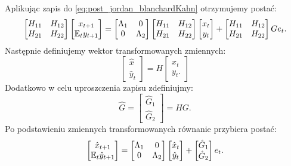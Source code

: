Aplikując zapis do \eqref{eq:post_jordan_blanchardKahn} otrzymujemy postać:
\begin{equation}
    \begin{bmatrix}
    H_{11} & H_{12} \\
    H_{21} & H_{22}
    \end{bmatrix}
    \begin{bmatrix}
    x_{t+1} \\
    \mathbb{E}_t y_{t+1}
\end{bmatrix} = \begin{bmatrix}
    \Lambda_{1} & 0 \\
    0 & \Lambda_{2}
    \end{bmatrix} \begin{bmatrix}
    H_{11} & H_{12} \\
    H_{21} & H_{22}
    \end{bmatrix} \begin{bmatrix}
    x_{t} \\
    y_{t}
\end{bmatrix} + \begin{bmatrix}
    H_{11} & H_{12} \\
    H_{21} & H_{22}
    \end{bmatrix} G e_t.
\end{equation}
Następnie definiujemy wektor transformowanych zmiennych:
\begin{equation}
\label{eqn:bk-transform}
    \begin{bmatrix}
    \hat{x}_{} \\
    \hat{y}_{t}
    \end{bmatrix} = H \begin{bmatrix}
    x_{t} \\
    y_{t}.
\end{bmatrix}
\end{equation}
Dodatkowo w celu uproszczenia zapisu zdefiniujmy:
\begin{equation}
    \hat{G} = \begin{bmatrix}
        \hat{G}_1 \\
        \hat{G}_2
    \end{bmatrix} = H G.
\end{equation}
Po podstawieniu zmiennych transformowanych równanie przybiera postać:
\begin{equation}
    \begin{bmatrix}
    \hat{x}_{t+1} \\
    \mathbb{E}_t \hat{y}_{t+1}
\end{bmatrix} = \begin{bmatrix}
    \Lambda_{1} & 0 \\
    0 & \Lambda_{2}
    \end{bmatrix} \begin{bmatrix}
    \hat{x}_{t} \\
    \hat{y}_{t}
\end{bmatrix} + \begin{bmatrix}
        \hat{G}_1 \\
        \hat{G}_2
    \end{bmatrix} e_t.
\end{equation}
